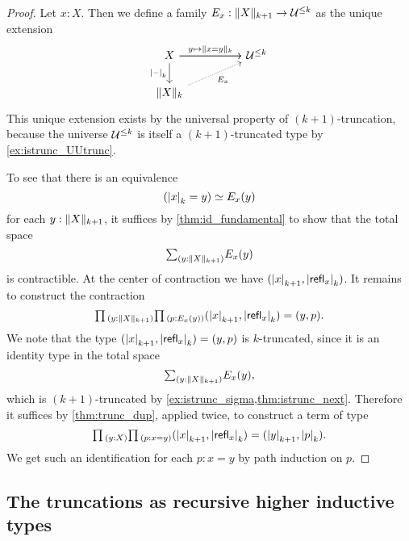 \begin{proof}
Let $x:X$. Then we define a family $E_x : \trunc{k+1}{X}\to \UU^{\leq k}$ as the unique extension
\begin{equation*}
\begin{tikzcd}[column sep=huge]
X \arrow[r] \arrow[d,swap,"\tproj{k}{\blank}"] \arrow[r,"{y\mapsto \trunc{k}{x=y}}"] & \UU^{\leq k} \\
\trunc{k}{X} \arrow[ur,densely dotted,swap,"E_x"] 
\end{tikzcd}
\end{equation*}
This unique extension exists by the universal property of $(k+1)$-truncation, because the universe $\UU^{\leq k}$ is itself a $(k+1)$-truncated type by \cref{ex:istrunc_UUtrunc}. 

To see that there is an equivalence 
\begin{equation*}
\eqv{(\tproj{k}{x}=y)}{E_x(y)}
\end{equation*}
for each $y:\trunc{k+1}{X}$, it suffices by \cref{thm:id_fundamental} to show that the total space 
\begin{equation*}
\sm{y:\trunc{k+1}{X}}E_x(y)
\end{equation*}
is contractible. At the center of contraction we have $(\tproj{k+1}{x},\tproj{k}{\refl{x}})$. It remains to construct the contraction
\begin{equation*}
\prd{y:\trunc{k+1}{X}}{p:E_x(y)} (\tproj{k+1}{x},\tproj{k}{\refl{x}})=(y,p).
\end{equation*}
We note that the type $(\tproj{k+1}{x},\tproj{k}{\refl{x}})=(y,p)$ is $k$-truncated, since it is an identity type in the total space
\begin{equation*}
\sm{y:\trunc{k+1}{X}}E_x(y),
\end{equation*}
which is $(k+1)$-truncated by \cref{ex:istrunc_sigma,thm:istrunc_next}. Therefore it suffices by \cref{thm:trunc_dup}, applied twice, to construct a term of type
\begin{equation*}
\prd{y:X}{p:x=y} (\tproj{k+1}{x},\tproj{k}{\refl{x}})=(\tproj{k+1}{y},\tproj{k}{p}).
\end{equation*}
We get such an identification for each $p:x=y$ by path induction on $p$.
\end{proof}

\subsection{The truncations as recursive higher inductive types}

